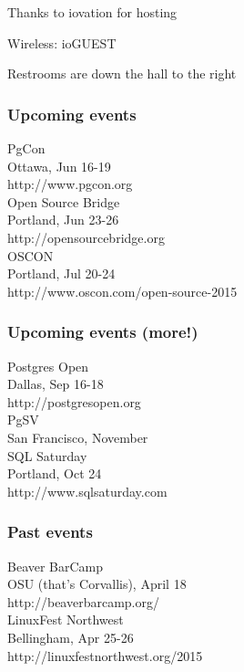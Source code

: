\documentclass{beamer}
\begin{document}

\frame
{
  \begin{center}
  \item[]Thanks to iovation for hosting
  \item[]Wireless: ioGUEST
  \item[]Restrooms are down the hall to the right
  \end{center}
}

\frame
{
  \frametitle{Upcoming events}
  \begin{center}
{\large PgCon\\}
Ottawa, Jun 16-19\\
http://www.pgcon.org\\
\vspace{5 mm}
{\large Open Source Bridge\\}
Portland, Jun 23-26\\
http://opensourcebridge.org\\
{\large OSCON\\}
Portland, Jul 20-24\\
http://www.oscon.com/open-source-2015\\
\vspace{5 mm}
  \end{center}
}

\frame
{
  \frametitle{Upcoming events (more!)}
  \begin{center}
{\large Postgres Open\\}
Dallas, Sep 16-18\\
http://postgresopen.org\\
\vspace{5 mm}
{\large PgSV\\}
San Francisco, November\\
\vspace{5 mm}
{\large SQL Saturday\\}
Portland, Oct 24\\
http://www.sqlsaturday.com\\
  \end{center}
}

\frame
{
  \frametitle{Past events}
  \begin{center}
{\large Beaver BarCamp\\}
OSU (that's Corvallis), April 18\\
http://beaverbarcamp.org/\\
\vspace{5 mm}
{\large LinuxFest Northwest\\}
Bellingham, Apr 25-26\\
http://linuxfestnorthwest.org/2015\\
\vspace{5 mm}
  \end{center}
}
\end{document}
